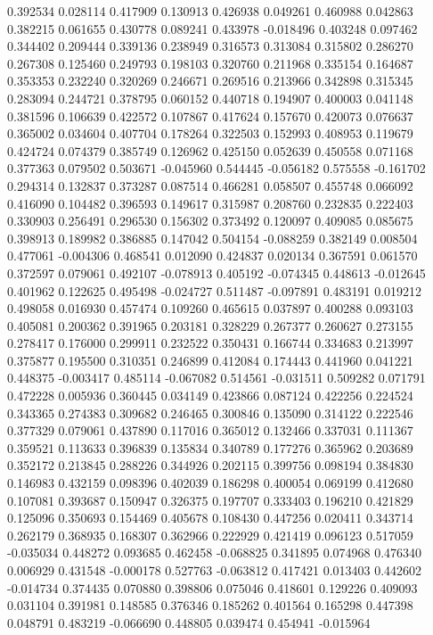 0.392534
0.028114
0.417909
0.130913
0.426938
0.049261
0.460988
0.042863
0.382215
0.061655
0.430778
0.089241
0.433978
-0.018496
0.403248
0.097462
0.344402
0.209444
0.339136
0.238949
0.316573
0.313084
0.315802
0.286270
0.267308
0.125460
0.249793
0.198103
0.320760
0.211968
0.335154
0.164687
0.353353
0.232240
0.320269
0.246671
0.269516
0.213966
0.342898
0.315345
0.283094
0.244721
0.378795
0.060152
0.440718
0.194907
0.400003
0.041148
0.381596
0.106639
0.422572
0.107867
0.417624
0.157670
0.420073
0.076637
0.365002
0.034604
0.407704
0.178264
0.322503
0.152993
0.408953
0.119679
0.424724
0.074379
0.385749
0.126962
0.425150
0.052639
0.450558
0.071168
0.377363
0.079502
0.503671
-0.045960
0.544445
-0.056182
0.575558
-0.161702
0.294314
0.132837
0.373287
0.087514
0.466281
0.058507
0.455748
0.066092
0.416090
0.104482
0.396593
0.149617
0.315987
0.208760
0.232835
0.222403
0.330903
0.256491
0.296530
0.156302
0.373492
0.120097
0.409085
0.085675
0.398913
0.189982
0.386885
0.147042
0.504154
-0.088259
0.382149
0.008504
0.477061
-0.004306
0.468541
0.012090
0.424837
0.020134
0.367591
0.061570
0.372597
0.079061
0.492107
-0.078913
0.405192
-0.074345
0.448613
-0.012645
0.401962
0.122625
0.495498
-0.024727
0.511487
-0.097891
0.483191
0.019212
0.498058
0.016930
0.457474
0.109260
0.465615
0.037897
0.400288
0.093103
0.405081
0.200362
0.391965
0.203181
0.328229
0.267377
0.260627
0.273155
0.278417
0.176000
0.299911
0.232522
0.350431
0.166744
0.334683
0.213997
0.375877
0.195500
0.310351
0.246899
0.412084
0.174443
0.441960
0.041221
0.448375
-0.003417
0.485114
-0.067082
0.514561
-0.031511
0.509282
0.071791
0.472228
0.005936
0.360445
0.034149
0.423866
0.087124
0.422256
0.224524
0.343365
0.274383
0.309682
0.246465
0.300846
0.135090
0.314122
0.222546
0.377329
0.079061
0.437890
0.117016
0.365012
0.132466
0.337031
0.111367
0.359521
0.113633
0.396839
0.135834
0.340789
0.177276
0.365962
0.203689
0.352172
0.213845
0.288226
0.344926
0.202115
0.399756
0.098194
0.384830
0.146983
0.432159
0.098396
0.402039
0.186298
0.400054
0.069199
0.412680
0.107081
0.393687
0.150947
0.326375
0.197707
0.333403
0.196210
0.421829
0.125096
0.350693
0.154469
0.405678
0.108430
0.447256
0.020411
0.343714
0.262179
0.368935
0.168307
0.362966
0.222929
0.421419
0.096123
0.517059
-0.035034
0.448272
0.093685
0.462458
-0.068825
0.341895
0.074968
0.476340
0.006929
0.431548
-0.000178
0.527763
-0.063812
0.417421
0.013403
0.442602
-0.014734
0.374435
0.070880
0.398806
0.075046
0.418601
0.129226
0.409093
0.031104
0.391981
0.148585
0.376346
0.185262
0.401564
0.165298
0.447398
0.048791
0.483219
-0.066690
0.448805
0.039474
0.454941
-0.015964
